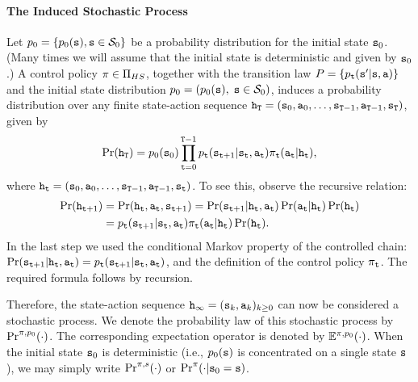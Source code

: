 \paragraph{The Induced Stochastic Process}
Let  ${p_0} = \{ {p_0}({\tt s}),{\tt s} \in {\mathcal{S}_0}\} $ be a
probability distribution for the initial state ${{\tt s}_0}$. (Many
times we will assume that the initial state is deterministic and
given by ${\tt s}_0$.) A control policy $\pi \in {\Pi _{HS}}$,
together with the transition law $P = \{
{p_{\tt t}}({\tt s}'|{\tt s},{\tt a})\} $ and the initial state
distribution ${p_0} = ({p_0}({\tt s}),\;{\tt s} \in {\mathcal{S}_0})$,
induces a probability distribution over any finite state-action
sequence ${{\tt h}_{\tt T}} = ({{\tt s}_0},{{\tt a}_0}, \ldots
,{{\tt s}_{{\tt T} - 1}},{{\tt a}_{{\tt T} -
1}},{{\tt s}_{\tt T}})$, given by
\[\Pr({{\tt h}_{\tt T}}) = {p_0}({{\tt s}_0})\prod\limits_{{\tt t} = 0}^{{\tt T} -1} {p_{\tt t}({{\tt s}_{{\tt t} + 1}}|{{\tt s}_{\tt t}},{{\tt a}_{\tt t}}){\pi _{\tt t}}({{\tt a}_{\tt t}}|{{\tt h}_{\tt t}})} ,\]
where ${{\tt h}_{\tt t}} = ({{\tt s}_0},{{\tt a}_0}, \ldots
,{{\tt s}_{{\tt T} -1}},{{\tt a}_{{\tt T} -1}},{{\tt s}_{\tt t}})$.
%
To see this, observe the recursive relation:
\begin{align*}
\Pr({{\tt h}_{{\tt t} + 1}}) &= \Pr({{\tt h}_{\tt t}},{{\tt a}_{\tt t}},{{\tt s}_{{\tt t} + 1}}) = \Pr({{\tt s}_{{\tt t} + 1}}|{{\tt h}_{\tt t}},{{\tt a}_{\tt t}})\Pr({{\tt a}_{\tt t}}|{{\tt h}_{\tt t}})\Pr({{\tt h}_{\tt t}})\\
 &= {p_{\tt t}}({{\tt s}_{{\tt t} + 1}}|{{\tt s}_{\tt t}},{{\tt a}_{\tt t}}){\pi _{\tt t}}({{\tt a}_{\tt t}}|{{\tt h}_{\tt t}})\Pr({{\tt h}_{\tt t}}).
\end{align*}
In the last step we used the conditional Markov property of the
controlled chain: $\Pr({{\tt s}_{{\tt t} +
1}}|{{\tt h}_{\tt t}},{{\tt a}_{\tt t}}) = {p_{\tt t}}({{\tt s}_{{\tt t}
+ 1}}|{{\tt s}_{\tt t}},{{\tt a}_{\tt t}})$, and the definition of the
control policy $\pi_{\tt t} $. The required formula follows by
recursion.

Therefore, the state-action sequence ${{\tt h}_\infty } =
{({{\tt s}_k},{{\tt a}_k})_{k \ge 0}}$ can now be considered a
stochastic process. We denote the probability law of this stochastic
process by ${\Pr^{\pi ,{p_0}}}( \cdot )$. The corresponding
expectation operator is denoted by ${\mathbb{E}^{\pi ,{p_0}}}( \cdot )$.
When the initial state ${{\tt s}_0}$ is deterministic (i.e.,
${p_0}({\tt s})$ is concentrated on a single state ${\tt s}$), we may
simply write ${\Pr^{\pi ,s}}( \cdot )$  or ${\Pr^\pi }( \cdot
|{{\tt s}_0} = {\tt s})$.

